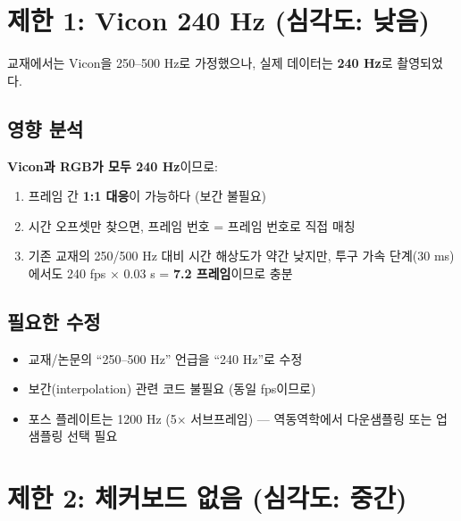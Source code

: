\documentclass[11pt, a4paper]{report}
\begin{document}
\section{제한 1: Vicon 240 Hz (심각도: 낮음)}
\label{sec:constraint1}

\begin{constraintbox}[title={제한 1: Vicon 프레임레이트}]
교재에서는 Vicon을 250--500 Hz로 가정했으나, 실제 데이터는 \textbf{240 Hz}로 촬영되었다.
\end{constraintbox}

\subsection{영향 분석}

\begin{solutionbox}[title={오히려 장점이 된다}]
\textbf{Vicon과 RGB가 모두 240 Hz}이므로:
\begin{enumerate}[nosep]
  \item 프레임 간 \textbf{1:1 대응}이 가능하다 (보간 불필요)
  \item 시간 오프셋만 찾으면, 프레임 번호 = 프레임 번호로 직접 매칭
  \item 기존 교재의 250/500 Hz 대비 시간 해상도가 약간 낮지만,
        투구 가속 단계(30 ms)에서도 240 fps $\times$ 0.03 s = \textbf{7.2 프레임}이므로 충분
\end{enumerate}
\end{solutionbox}

\subsection{필요한 수정}

\begin{itemize}[leftmargin=*]
  \item 교재/논문의 ``250--500 Hz'' 언급을 ``240 Hz''로 수정
  \item 보간(interpolation) 관련 코드 불필요 (동일 fps이므로)
  \item 포스 플레이트는 1200 Hz (5$\times$ 서브프레임) --- 역동역학에서 다운샘플링 또는 업샘플링 선택 필요
\end{itemize}


\section{제한 2: 체커보드 없음 (심각도: 중간)}
\label{sec:constraint2}
\end{document}
